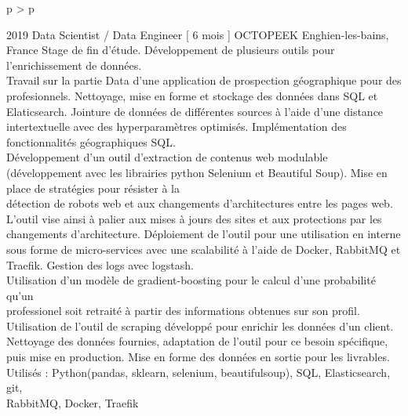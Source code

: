 \documentclass[cv]{cv_style}
\begin{document}
{\begin{tabular}{p{\leftsize\textwidth} > {\arraybackslash}p{\rightsize\textwidth}}
\begin{minipage}[t]{\rightsize\textwidth}
    \frcventry
        {2019 \hspace{0.6cm}}   
        {Data Scientist / Data Engineer \hfill  [ 6 mois ] }
        {OCTOPEEK}
        {Enghien-les-bains, France}
        {
					Stage de fin d'étude. Développement de plusieurs outils pour l'enrichissement de données. \\
            \vspace{0.0cm}
            \rightchevron\hspace{.1cm} Travail sur la partie Data d'une application de prospection géographique pour des \\
						profesionnels. Nettoyage, mise en forme et stockage des données dans SQL et Elaticsearch. 
						Jointure de données de différentes sources à l'aide d'une distance intertextuelle avec des hyperparamètres optimisés.
						Implémentation des fonctionnalités géographiques SQL.\\
            \vspace{0.0cm}
						\rightchevron\hspace{.1cm} Développement d'un outil d'extraction de contenus web modulable (développement avec les librairies python Selenium et Beautiful Soup).  Mise en place de stratégies pour résister à la \\
						détection de robots web et aux changements d'architectures entre les pages web. L'outil vise ainsi à palier aux mises à jours des sites et aux protections par les changements d'architecture. Déploiement de l'outil pour une utilisation en interne sous forme de micro-services avec une scalabilité à l'aide de Docker, RabbitMQ et Traefik. Gestion des logs avec logstash.\\
            \vspace{0.0cm}
            \rightchevron\hspace{.1cm} Utilisation d'un modèle de gradient-boosting pour le calcul d'une probabilité qu'un \\professionel soit retraité à partir des informations obtenues sur son profil.\\
            \vspace{0.0cm}
            \rightchevron\hspace{.1cm} Utilisation de l'outil de scraping développé pour enrichir les données d'un client. \\Nettoyage des données fournies, adaptation de l'outil pour ce besoin spécifique, puis mise en production. Mise en forme des données en sortie pour les livrables.
        }
				{Utilisés :}
				{Python(pandas, sklearn, selenium, beautifulsoup), SQL, Elasticsearch, git, \\RabbitMQ, Docker, Traefik}


\end{minipage}
\end{tabular}}
\end{document}
